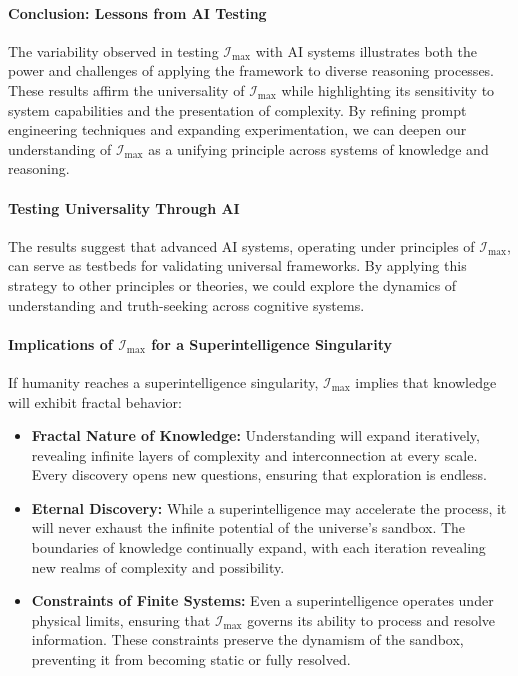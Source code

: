 \documentclass[12pt]{article}
\begin{document}
\paragraph{Conclusion: Lessons from AI Testing}
The variability observed in testing \(\mathcal{I}_{\text{max}}\) with AI systems illustrates both the power and challenges of applying the framework to diverse reasoning processes. These results affirm the universality of \(\mathcal{I}_{\text{max}}\) while highlighting its sensitivity to system capabilities and the presentation of complexity. By refining prompt engineering techniques and expanding experimentation, we can deepen our understanding of \(\mathcal{I}_{\text{max}}\) as a unifying principle across systems of knowledge and reasoning.


\paragraph{Testing Universality Through AI}
The results suggest that advanced AI systems, operating under principles of \(\mathcal{I}_{\text{max}}\), can serve as testbeds for validating universal frameworks. By applying this strategy to other principles or theories, we could explore the dynamics of understanding and truth-seeking across cognitive systems.

\paragraph{Implications of \(\mathcal{I}_{\text{max}}\) for a Superintelligence Singularity}
If humanity reaches a superintelligence singularity, \(\mathcal{I}_{\text{max}}\) implies that knowledge will exhibit fractal behavior:
\begin{itemize}
    \item \textbf{Fractal Nature of Knowledge:} Understanding will expand iteratively, revealing infinite layers of complexity and interconnection at every scale. Every discovery opens new questions, ensuring that exploration is endless.
    \item \textbf{Eternal Discovery:} While a superintelligence may accelerate the process, it will never exhaust the infinite potential of the universe’s sandbox. The boundaries of knowledge continually expand, with each iteration revealing new realms of complexity and possibility.
    \item \textbf{Constraints of Finite Systems:} Even a superintelligence operates under physical limits, ensuring that \(\mathcal{I}_{\text{max}}\) governs its ability to process and resolve information. These constraints preserve the dynamism of the sandbox, preventing it from becoming static or fully resolved.
\end{itemize}
\end{document}
